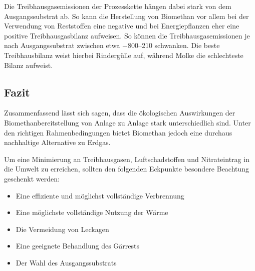 Die Treibhausgasemissionen der Prozesskette hängen dabei stark von dem Ausgangssubstrat ab. So kann die Herstellung von Biomethan vor allem bei der Verwendung von Reststoffen eine negative und bei Energiepflanzen eher eine positive Treibhausgasbilanz aufweisen. So können die Treibhausgasemissionen je nach Ausgangssubstrat zwischen etwa \SIrange{-800}{210}{\gcoeqmj} schwanken. Die beste Treibhausbilanz weist hierbei Rindergülle auf, während Molke die schlechteste Bilanz aufweist. \parencite{Tonini2016}


\subsection{Fazit}

Zusammenfassend lässt sich sagen, dass die ökologischen Auswirkungen der Biomethanbereitstellung von Anlage zu Anlage stark unterschiedlich sind. Unter den richtigen Rahmenbedingungen bietet Biomethan jedoch eine durchaus nachhaltige Alternative zu Erdgas.\smallskip

Um eine Minimierung an Treibhausgasen, Luftschadstoffen und Nitrateintrag in die Umwelt zu erreichen, sollten den folgenden Eckpunkte besondere Beachtung geschenkt werden:

\begin{itemize}
	\item Eine effiziente und möglichst vollständige Verbrennung
	\item Eine möglichste vollständige Nutzung der Wärme
	\item Die Vermeidung von Leckagen
	\item Eine geeignete Behandlung des Gärrests
	\item Der Wahl des Ausgangssubstrats
\end{itemize}